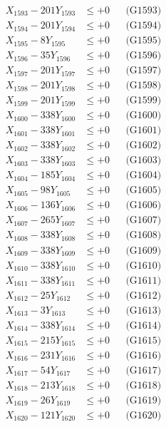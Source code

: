 \documentclass[a4paper,10pt]{article}
\begin{document}
{\begin{align}
X_{1593} - 201Y_{1593} &\leq +0 && \text{(G1593)} \\
X_{1594} - 201Y_{1594} &\leq +0 && \text{(G1594)} \\
X_{1595} - 8Y_{1595} &\leq +0 && \text{(G1595)} \\
X_{1596} - 35Y_{1596} &\leq +0 && \text{(G1596)} \\
X_{1597} - 201Y_{1597} &\leq +0 && \text{(G1597)} \\
X_{1598} - 201Y_{1598} &\leq +0 && \text{(G1598)} \\
X_{1599} - 201Y_{1599} &\leq +0 && \text{(G1599)} \\
X_{1600} - 338Y_{1600} &\leq +0 && \text{(G1600)} \\
\allowbreak
X_{1601} - 338Y_{1601} &\leq +0 && \text{(G1601)} \\
X_{1602} - 338Y_{1602} &\leq +0 && \text{(G1602)} \\
X_{1603} - 338Y_{1603} &\leq +0 && \text{(G1603)} \\
X_{1604} - 185Y_{1604} &\leq +0 && \text{(G1604)} \\
X_{1605} - 98Y_{1605} &\leq +0 && \text{(G1605)} \\
X_{1606} - 136Y_{1606} &\leq +0 && \text{(G1606)} \\
X_{1607} - 265Y_{1607} &\leq +0 && \text{(G1607)} \\
X_{1608} - 338Y_{1608} &\leq +0 && \text{(G1608)} \\
X_{1609} - 338Y_{1609} &\leq +0 && \text{(G1609)} \\
X_{1610} - 338Y_{1610} &\leq +0 && \text{(G1610)} \\
\allowbreak
X_{1611} - 338Y_{1611} &\leq +0 && \text{(G1611)} \\
X_{1612} - 25Y_{1612} &\leq +0 && \text{(G1612)} \\
X_{1613} - 3Y_{1613} &\leq +0 && \text{(G1613)} \\
X_{1614} - 338Y_{1614} &\leq +0 && \text{(G1614)} \\
X_{1615} - 215Y_{1615} &\leq +0 && \text{(G1615)} \\
X_{1616} - 231Y_{1616} &\leq +0 && \text{(G1616)} \\
X_{1617} - 54Y_{1617} &\leq +0 && \text{(G1617)} \\
X_{1618} - 213Y_{1618} &\leq +0 && \text{(G1618)} \\
X_{1619} - 26Y_{1619} &\leq +0 && \text{(G1619)} \\
X_{1620} - 121Y_{1620} &\leq +0 && \text{(G1620)} \\

\end{align}}
\end{document}

